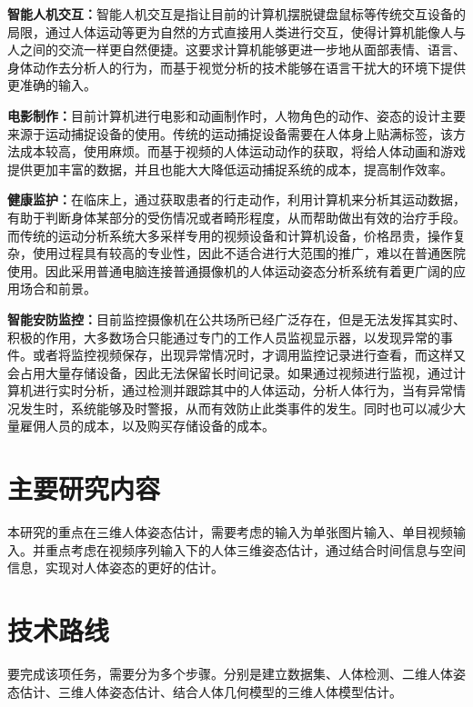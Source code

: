 \textbf{智能人机交互：}智能人机交互是指让目前的计算机摆脱键盘鼠标等传统交互设备的局限，通过人体运动等更为自然的方式直接用人类进行交互，使得计算机能像人与人之间的交流一样更自然便捷。这要求计算机能够更进一步地从面部表情、语言、身体动作去分析人的行为，而基于视觉分析的技术能够在语言干扰大的环境下提供更准确的输入。

\textbf{电影制作：}目前计算机进行电影和动画制作时，人物角色的动作、姿态的设计主要来源于运动捕捉设备的使用。传统的运动捕捉设备需要在人体身上贴满标签，该方法成本较高，使用麻烦。而基于视频的人体运动动作的获取，将给人体动画和游戏提供更加丰富的数据，并且也能大大降低运动捕捉系统的成本，提高制作效率。


\textbf{健康监护：}在临床上，通过获取患者的行走动作，利用计算机来分析其运动数据，有助于判断身体某部分的受伤情况或者畸形程度，从而帮助做出有效的治疗手段。而传统的运动分析系统大多采样专用的视频设备和计算机设备，价格昂贵，操作复杂，使用过程具有较高的专业性，因此不适合进行大范围的推广，难以在普通医院使用。因此采用普通电脑连接普通摄像机的人体运动姿态分析系统有着更广阔的应用场合和前景。

\textbf{智能安防监控：}目前监控摄像机在公共场所已经广泛存在，但是无法发挥其实时、积极的作用，大多数场合只能通过专门的工作人员监视显示器，以发现异常的事件。或者将监控视频保存，出现异常情况时，才调用监控记录进行查看，而这样又会占用大量存储设备，因此无法保留长时间记录。如果通过视频进行监视，通过计算机进行实时分析，通过检测并跟踪其中的人体运动，分析人体行为，当有异常情况发生时，系统能够及时警报，从而有效防止此类事件的发生。同时也可以减少大量雇佣人员的成本，以及购买存储设备的成本。



\section{主要研究内容}
本研究的重点在三维人体姿态估计，需要考虑的输入为单张图片输入、单目视频输入。并重点考虑在视频序列输入下的人体三维姿态估计，通过结合时间信息与空间信息，实现对人体姿态的更好的估计。

\section{技术路线}
要完成该项任务，需要分为多个步骤。分别是建立数据集、人体检测、二维人体姿态估计、三维人体姿态估计、结合人体几何模型的三维人体模型估计。

